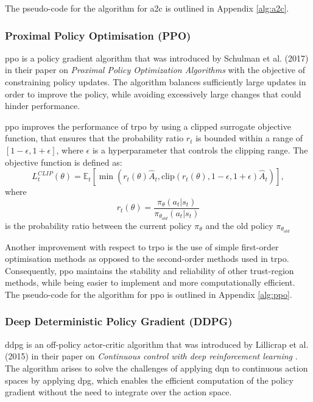The pseudo-code for the algorithm for \acrshort{a2c} is outlined in Appendix \ref{alg:a2c}. 

\subsubsection{Proximal Policy Optimisation (PPO)} \label{sec:ppo}

\acrfull{ppo} is a policy gradient algorithm that was introduced by Schulman et al. (2017) in their paper on \textit{Proximal Policy Optimization Algorithms} \cite{Schulman2017} with the objective of constraining policy updates. The algorithm balances sufficiently large updates in order to improve the policy, while avoiding excessively large changes that could hinder performance. 

\acrshort{ppo} improves the performance of \acrfull{trpo} \cite{Schulman2015} by using a clipped surrogate objective function, that ensures that the probability ratio $r_t$ is bounded within a range of $[1 - \epsilon, 1 + \epsilon]$, where $\epsilon$ is a hyperparameter that controls the clipping range. The objective function is defined as:
\begin{equation}
    L_t^{CLIP}(\theta) = \mathbb{E}_t \left[\min\left(r_t(\theta) \hat{A}_t, \text{clip}\left(r_t(\theta), 1 - \epsilon, 1 + \epsilon\right) \hat{A}_t\right)\right],
\end{equation}
where
\begin{equation}
    r_t(\theta) = \frac{\pi_\theta(a_t | s_t)}{\pi_{\theta_{old}}(a_t | s_t)}
\end{equation}
is the probability ratio between the current policy $\pi_\theta$ and the old policy $\pi_{\theta_{old}}$

Another improvement with respect to \acrshort{trpo} is the use of simple first-order optimisation methods as opposed to the second-order methods used in \acrshort{trpo}. Consequently, \acrshort{ppo} maintains the stability and reliability of other trust-region methods, while being easier to implement and more computationally efficient. The pseudo-code for the algorithm for \acrshort{ppo} is outlined in Appendix \ref{alg:ppo}.

\subsubsection{Deep Deterministic Policy Gradient (DDPG)} \label{sec:ddpg}

\acrfull{ddpg} is an off-policy actor-critic algorithm that was introduced by Lillicrap et al. (2015) in their paper on \textit{Continuous control with deep reinforcement learning} \cite{Lillicrap2015}. The algorithm arises to solve the challenges of applying \acrlong{dqn} \cite{Mnih2013} to continuous action spaces by applying \acrfull{dpg}, which enables the efficient computation of the policy gradient without the need to integrate over the action space. 

